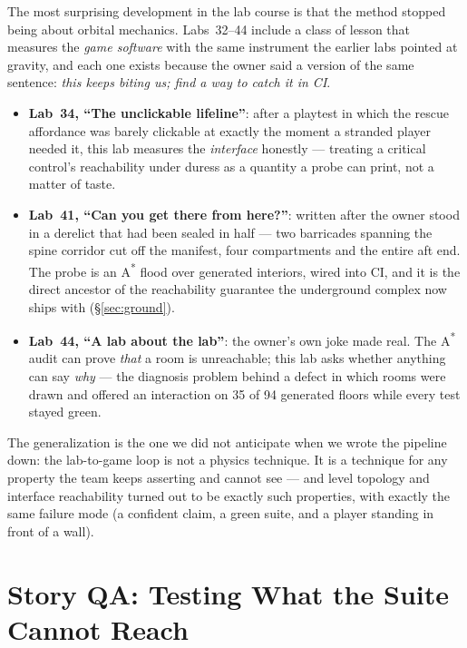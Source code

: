 \documentclass[10pt,twocolumn]{article}
\begin{document}
The most surprising development in the lab course is that the method stopped being about
orbital mechanics. Labs~32--44 include a class of lesson that measures the \emph{game
software} with the same instrument the earlier labs pointed at gravity, and each one exists
because the owner said a version of the same sentence: \emph{this keeps biting us; find a way
to catch it in CI}.

\begin{itemize}
  \item \textbf{Lab~34, ``The unclickable lifeline''}: after a playtest in which the rescue
        affordance was barely clickable at exactly the moment a stranded player needed it,
        this lab measures the \emph{interface} honestly --- treating a critical control's
        reachability under duress as a quantity a probe can print, not a matter of taste.
  \item \textbf{Lab~41, ``Can you get there from here?''}: written after the owner stood in a
        derelict that had been sealed in half --- two barricades spanning the spine corridor
        cut off the manifest, four compartments and the entire aft end. The probe is an
        A\textsuperscript{*} flood over generated interiors, wired into CI, and it is the
        direct ancestor of the reachability guarantee the underground complex now ships with
        (\S\ref{sec:ground}).
  \item \textbf{Lab~44, ``A lab about the lab''}: the owner's own joke made real. The
        A\textsuperscript{*} audit can prove \emph{that} a room is unreachable; this lab asks
        whether anything can say \emph{why} --- the diagnosis problem behind a defect in which
        rooms were drawn and offered an interaction on 35 of 94 generated floors while every
        test stayed green.
\end{itemize}

The generalization is the one we did not anticipate when we wrote the pipeline down: the
lab-to-game loop is not a physics technique. It is a technique for any property the team
keeps asserting and cannot see --- and level topology and interface reachability turned out
to be exactly such properties, with exactly the same failure mode (a confident claim, a green
suite, and a player standing in front of a wall).

\section{Story QA: Testing What the Suite Cannot Reach}
\label{sec:storyqa}
\end{document}
